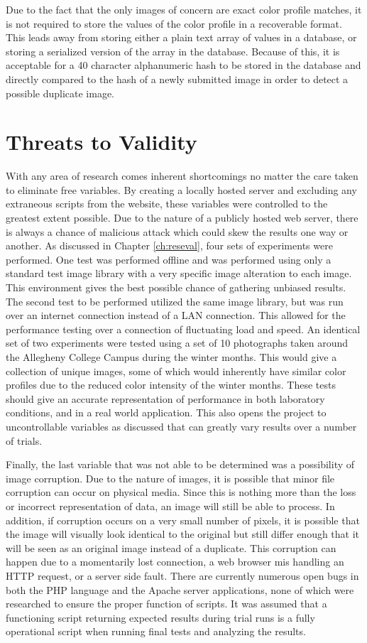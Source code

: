 Due to the fact that the only images of concern are exact color profile matches, it is not required to store the values of the color profile in a recoverable format. This leads away from storing either a plain text array of values in a database, or storing a serialized version of the array in the database. Because of this, it is acceptable for a 40 character alphanumeric hash to be stored in the database and directly compared to the hash of a newly submitted image in order to detect a possible duplicate image.

\section{Threats to Validity}  \label{sec:threats}
With any area of research comes inherent shortcomings no matter the care taken to eliminate free variables. By creating a locally hosted server and excluding any extraneous scripts from the website, these variables were controlled to the greatest extent possible. Due to the nature of a publicly hosted web server, there is always a chance of malicious attack which could skew the results one way or another. As discussed in Chapter \ref{ch:reseval}, four sets of experiments were performed. One test was performed offline and was performed using only a standard test image library with a very specific image alteration to each image. This environment gives the best possible chance of gathering unbiased results. The second test to be performed utilized the same image library, but was run over an internet connection instead of a LAN connection. This allowed for the performance testing over a connection of fluctuating load and speed. An identical set of two experiments were tested using a set of 10 photographs taken around the Allegheny College Campus during the winter months. This would give a collection of unique images, some of which would inherently have similar color profiles due to the reduced color intensity of the winter months. These tests should give an accurate representation of performance in both laboratory conditions, and in a real world application. This also opens the project to uncontrollable variables as discussed that can greatly vary results over a number of trials.

Finally, the last variable that was not able to be determined was a possibility of image corruption. Due to the nature of images, it is possible that minor file corruption can occur on physical media. Since this is nothing more than the loss or incorrect representation of data, an image will still be able to process. In addition, if corruption occurs on a very small number of pixels, it is possible that the image will visually look identical to the original but still differ enough that it will be seen as an original image instead of a duplicate. This corruption can happen due to a momentarily lost connection, a web browser mis handling an HTTP request, or a server side fault. There are currently numerous open bugs in both the PHP language and the Apache server applications, none of which were researched to ensure the proper function of scripts. It was assumed that a functioning script returning expected results during trial runs is a fully operational script when running final tests and analyzing the results.